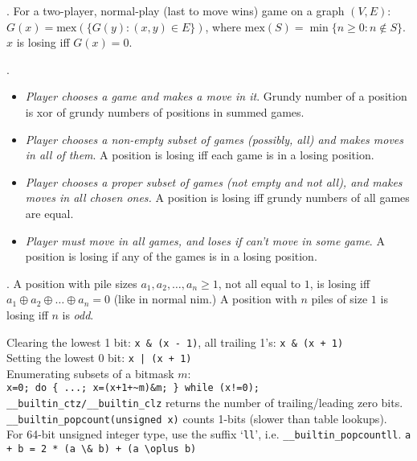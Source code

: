 
.
For a two-player, normal-play (last to move wins) game on a graph $(V,E)$:
$G(x) = \mbox{mex}(\{ G(y) : (x, y) \in E \})$,
where $\mbox{mex}(S) = \min \{ n \ge 0: n \not\in S \}$.
$x$ is losing iff $G(x) = 0$.

.

\vspace{-4mm}
\begin{itemize}
  \item
    \emph{Player chooses a game and makes a move in it}.
    Grundy number of a position is xor of grundy numbers of positions in summed games.
  \item
    \emph{Player chooses a non-empty subset of games (possibly, all) and makes moves in all of them}.
    A position is losing iff each game is in a losing position.
  \item
    \emph{Player chooses a proper subset of games (not empty and not all),
        and makes moves in all chosen ones.}
    A position is losing iff grundy numbers of all games are equal.
  \item
    \emph{Player must move in all games, and loses if can't move in some game}.
    A position is losing if any of the games is in a losing position.
\end{itemize}

\vspace{-3mm}

.
A position with pile sizes $a_1, a_2, \dots, a_n \ge 1$,
not all equal to $1$, is losing iff $a_1 \oplus a_2 \oplus \dots \oplus a_n = 0$
(like in normal nim.)
A position with $n$ piles of size $1$ is losing iff $n$ is \emph{odd}.



Clearing the lowest 1 bit: \verb$x & (x - 1)$, all trailing 1's: \verb$x & (x + 1)$ \\
Setting the lowest 0 bit: \verb$x | (x + 1)$ \\
Enumerating subsets of a bitmask $m$: \\
\verb|x=0; do { ...; x=(x+1+~m)&m; } while (x!=0);| \\
\verb$__builtin_ctz/__builtin_clz$ returns the number of trailing/leading zero bits. \\
\verb$__builtin_popcount(unsigned x)$ counts 1-bits (slower than table lookups). \\
For 64-bit unsigned integer type, use the suffix `\verb$ll$', i.e. \verb$__builtin_popcountll$.
\verb$a + b = 2 * (a \& b) + (a \oplus b)$

